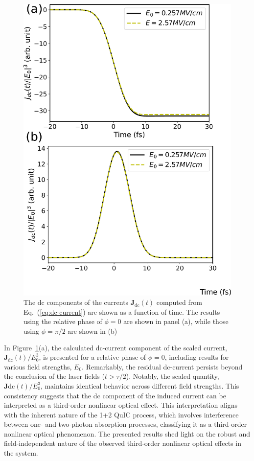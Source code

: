 \begin{figure}[htbp]
\centering
 \includegraphics[width=0.8\linewidth]{pic/dc_current.pdf}
\caption{\label{fig:dc_current} 
The dc components of the currents $\mathbf{J}_{\text{dc}}(t)$ computed from Eq.~(\ref{eq:dc-current}) are shown as a function of time. The results using the relative phase of $\phi=0$ are shown in panel (a), while those using $\phi=\pi/2$ are shown in (b) }
\end{figure}

In Figure~\ref{fig:dc_current}(a), the calculated dc-current component of the scaled current, $\mathbf{J}_{\text{dc}}(t)/E_0^3$, is presented for a relative phase of $\phi=0$, including results for various field strengths, $E_0$. Remarkably, the residual dc-current persists beyond the conclusion of the laser fields ($t>\tau/2$). Notably, the scaled quantity, $\mathbf{J}{\text{dc}}(t)/E_0^3$, maintains identical behavior across different field strengths. This consistency suggests that the dc component of the induced current can be interpreted as a third-order nonlinear optical effect. This interpretation aligns with the inherent nature of the 1+2 \gls{QuIC} process, which involves interference between one- and two-photon absorption processes, classifying it as a third-order nonlinear optical phenomenon. The presented results shed light on the robust and field-independent nature of the observed third-order nonlinear optical effects in the system.

